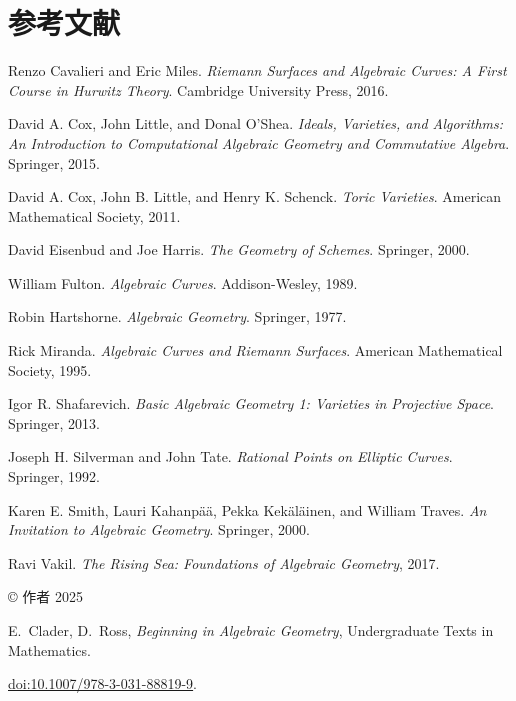\chapter*{参考文献}\label{chap:bibliography}

\begin{enumerate}[label={[\arabic*]},ref=\arabic*,leftmargin=*,align=left]
  \item\label{bib:cavalieri-miles} Renzo Cavalieri and Eric Miles. \emph{Riemann Surfaces and Algebraic Curves: A First Course in Hurwitz Theory}. Cambridge University Press, 2016.
  \item\label{bib:cox-little-oshea} David A. Cox, John Little, and Donal O’Shea. \emph{Ideals, Varieties, and Algorithms: An Introduction to Computational Algebraic Geometry and Commutative Algebra}. Springer, 2015.
  \item\label{bib:cox-little-schenck} David A. Cox, John B. Little, and Henry K. Schenck. \emph{Toric Varieties}. American Mathematical Society, 2011.
  \item\label{bib:eisenbud-harris} David Eisenbud and Joe Harris. \emph{The Geometry of Schemes}. Springer, 2000.
  \item\label{bib:fulton} William Fulton. \emph{Algebraic Curves}. Addison-Wesley, 1989.
  \item\label{bib:hartshorne} Robin Hartshorne. \emph{Algebraic Geometry}. Springer, 1977.
  \item\label{bib:miranda} Rick Miranda. \emph{Algebraic Curves and Riemann Surfaces}. American Mathematical Society, 1995.
  \item\label{bib:shafarevich} Igor R. Shafarevich. \emph{Basic Algebraic Geometry 1: Varieties in Projective Space}. Springer, 2013.
  \item\label{bib:silverman-tate} Joseph H. Silverman and John Tate. \emph{Rational Points on Elliptic Curves}. Springer, 1992.
  \item\label{bib:smith-et-al} Karen E. Smith, Lauri Kahanpää, Pekka Kekäläinen, and William Traves. \emph{An Invitation to Algebraic Geometry}. Springer, 2000.
  \item\label{bib:vakil} Ravi Vakil. \emph{The Rising Sea: Foundations of Algebraic Geometry}, 2017.
\end{enumerate}

\par\medskip
{\footnotesize
\noindent © 作者 2025\par
\noindent E.\ Clader, D.\ Ross, \emph{Beginning in Algebraic Geometry}, Undergraduate Texts in Mathematics.\par
\noindent
\href{https://doi.org/10.1007/978-3-031-88819-9}{doi:10.1007/978-3-031-88819-9}.\par
}

